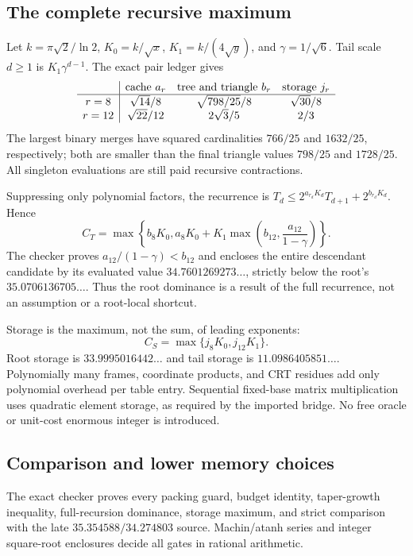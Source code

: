 \documentclass[11pt,letterpaper]{article}
\theoremstyle{remark}\newtheorem{remark}[theorem]{Remark}
\begin{document}
\subsection{The complete recursive maximum}
Let $k=\pi\sqrt2/\ln2$, $K_0=k/\sqrt x$, $K_1=k/(4\sqrt y)$,
and $\gamma=1/\sqrt6$. Tail scale $d\ge1$ is $K_1\gamma^{d-1}$.
The exact pair ledger gives
\[
\begin{array}{c|ccc}
 &\hbox{cache }a_r&\hbox{tree and triangle }b_r&\hbox{storage }j_r\\\hline
r=8&\sqrt{14}/8&\sqrt{798/25}/8&\sqrt{30}/8\\
r=12&\sqrt{22}/12&2\sqrt3/5&2/3
\end{array}
\]
The largest binary merges have squared cardinalities $766/25$ and $1632/25$,
respectively; both are smaller than the final triangle values $798/25$ and
$1728/25$. All singleton evaluations are still paid recursive contractions.

Suppressing only polynomial factors, the recurrence is
$T_d\le2^{a_{r_d}K_d}T_{d+1}+2^{b_{r_d}K_d}$. Hence
\begin{equation}\label{eq:cache-time}
 C_T=\max\left\{b_8K_0,
 a_8K_0+K_1\max\left(b_{12},\frac{a_{12}}{1-\gamma}\right)\right\}.
\end{equation}
The checker proves $a_{12}/(1-\gamma)<b_{12}$ and encloses the entire
descendant candidate by its evaluated value $34.7601269273\ldots$, strictly
below the root's $35.0706136705\ldots$. Thus the root dominance is a result
of the full recurrence, not an assumption or a root-local shortcut.

Storage is the maximum, not the sum, of leading exponents:
\begin{equation}\label{eq:cache-space}
 C_S=\max\{j_8K_0,j_{12}K_1\}.
\end{equation}
Root storage is $33.9995016442\ldots$ and tail storage is
$11.0986405851\ldots$. Polynomially many frames, coordinate products, and
CRT residues add only polynomial overhead per table entry. Sequential fixed-base
matrix multiplication uses quadratic element storage, as required by the imported
bridge. No free oracle or unit-cost enormous integer is introduced.

\subsection{Comparison and lower memory choices}
The exact checker proves every packing guard, budget identity, taper-growth
inequality, full-recursion dominance, storage maximum, and strict comparison
with the late $35.354588/34.274803$ source. Machin/atanh series and integer
square-root enclosures decide all gates in rational arithmetic.
\end{document}
